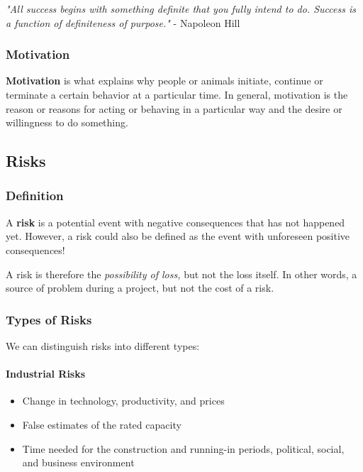 \documentclass[a4paper]{extarticle}
\begin{document}
\begin{cbox}
    \textit{"All success begins with something definite that you fully intend to do. Success is a function of definiteness of purpose."} - Napoleon Hill
\end{cbox}

\subsubsection{Motivation}

\textbf{Motivation} is what explains why people or animals initiate, continue or terminate a certain behavior at a particular time. In general, motivation is the reason or reasons for acting or behaving in a particular way and the desire or willingness to do something.

\subsection{Risks}

\subsubsection{Definition}

A \textbf{risk} is a potential event with negative consequences that has not happened yet. However, a risk could also be defined as the event with unforeseen positive consequences!

A risk is therefore the \textit{possibility of loss,} but not the loss itself. In other words, a source of problem during a project, but not the cost of a risk.

\subsubsection{Types of Risks}

We can distinguish risks into different types:

\paragraph{Industrial Risks}

\begin{itemize}
    \item Change in technology, productivity, and prices
    \item False estimates of the rated capacity
    \item Time needed for the construction and running-in periods, political, social, and business environment
\end{itemize}
\end{document}
